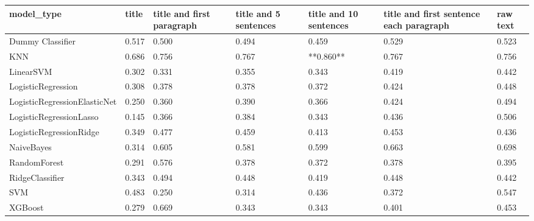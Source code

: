 \begin{tabular}{lllllll}
\toprule
                  model\_type & title & title and first paragraph & title and 5 sentences & title and 10 sentences & title and first sentence each paragraph & raw text \\
\midrule
            Dummy Classifier & 0.517 &                     0.500 &                 0.494 &                  0.459 &                                   0.529 &    0.523 \\
                         KNN & 0.686 &                     0.756 &                 0.767 &              **0.860** &                                   0.767 &    0.756 \\
                   LinearSVM & 0.302 &                     0.331 &                 0.355 &                  0.343 &                                   0.419 &    0.442 \\
          LogisticRegression & 0.308 &                     0.378 &                 0.378 &                  0.372 &                                   0.424 &    0.448 \\
LogisticRegressionElasticNet & 0.250 &                     0.360 &                 0.390 &                  0.366 &                                   0.424 &    0.494 \\
     LogisticRegressionLasso & 0.145 &                     0.366 &                 0.384 &                  0.343 &                                   0.436 &    0.506 \\
     LogisticRegressionRidge & 0.349 &                     0.477 &                 0.459 &                  0.413 &                                   0.453 &    0.436 \\
                  NaiveBayes & 0.314 &                     0.605 &                 0.581 &                  0.599 &                                   0.663 &    0.698 \\
                RandomForest & 0.291 &                     0.576 &                 0.378 &                  0.372 &                                   0.378 &    0.395 \\
             RidgeClassifier & 0.343 &                     0.494 &                 0.448 &                  0.419 &                                   0.448 &    0.442 \\
                         SVM & 0.483 &                     0.250 &                 0.314 &                  0.436 &                                   0.372 &    0.547 \\
                     XGBoost & 0.279 &                     0.669 &                 0.343 &                  0.343 &                                   0.401 &    0.453 \\
\bottomrule
\end{tabular}
